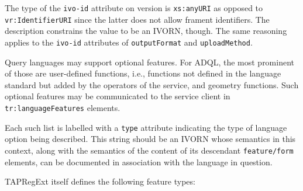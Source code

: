 \documentclass{ivoa}
\begin{document}
The type of the \texttt{ivo-id} attribute on version is 
\texttt{xs:anyURI} as opposed to \texttt{vr:IdentifierURI} since
the latter does not allow frament identifiers. 
The description constrains the value to be an
IVORN, though.  The same reasoning applies to the \texttt{ivo-id}
attributes of \texttt{outputFormat} and \texttt{uploadMethod}.

Query languages may support optional features.  For ADQL, the most prominent
of those are user-defined functions, i.e., functions not defined in the language
standard but added by the operators of the service, and geometry functions.
Such optional features may be communicated to the service client in
\texttt{tr:languageFeatures} elements.  

Each such list is labelled with a \texttt{type} attribute
indicating the type of language option being described.
This string should be an IVORN whose semantics in this context,
along with the semantics of the content of its descendant 
\texttt{feature/form} elements,
can be documented in association with the language in question.

TAPRegExt itself defines the following feature types:
\end{document}
